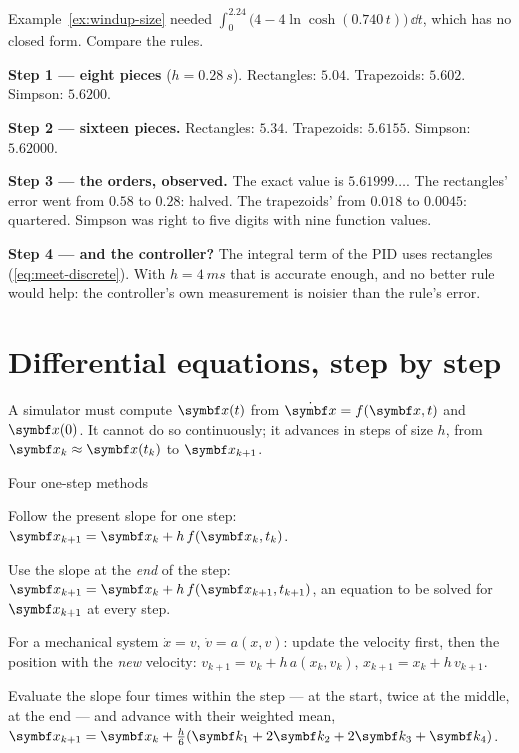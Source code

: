 \begin{example}
\label{ex:F-quad}
Example~\ref{ex:windup-size} needed $\int_0^{2.24}\big(4 - 4\ln\cosh(0.740\,t)\big)\,\dd t$, which has no closed form. Compare the rules.

\textbf{Step 1 — eight pieces} ($h = \SI{0.28}{s}$). Rectangles: $5.04$. Trapezoids: $5.602$. Simpson: $5.6200$.

\textbf{Step 2 — sixteen pieces.} Rectangles: $5.34$. Trapezoids: $5.6155$. Simpson: $5.62000$.

\textbf{Step 3 — the orders, observed.} The exact value is $5.61999\dots$. The rectangles' error went from $0.58$ to $0.28$: halved. The trapezoids' from $0.018$ to $0.0045$: quartered. Simpson was right to five digits with nine function values.

\textbf{Step 4 — and the controller?} The integral term of the PID uses rectangles (\cref{eq:meet-discrete}). With $h = \SI{4}{ms}$ that is accurate enough, and no better rule would help: the controller's own measurement is noisier than the rule's error.
\end{example}

\section{Differential equations, step by step}

A simulator must compute $\vx(t)$ from $\dot{\vx} = f(\vx, t)$ and $\vx(0)$. It cannot do so continuously; it advances in steps of size $h$, from $\vx_k \approx \vx(t_k)$ to $\vx_{k+1}$.

\begin{definition}{Four one-step methods}
\begin{description}[leftmargin=0pt, itemsep=3pt, font=\sffamily\small\bfseries]
  \item[Explicit Euler.] Follow the present slope for one step: $\vx_{k+1} = \vx_k + h\,f(\vx_k, t_k)$.
  \item[Implicit Euler.] Use the slope at the \emph{end} of the step: $\vx_{k+1} = \vx_k + h\,f(\vx_{k+1}, t_{k+1})$, an equation to be solved for $\vx_{k+1}$ at every step.
  \item[Semi-implicit (symplectic) Euler.] For a mechanical system $\dot x = v$, $\dot v = a(x, v)$: update the velocity first, then the position with the \emph{new} velocity: $v_{k+1} = v_k + h\,a(x_k, v_k)$, $x_{k+1} = x_k + h\,v_{k+1}$.
  \item[Runge–Kutta of order four (RK4).] Evaluate the slope four times within the step — at the start, twice at the middle, at the end — and advance with their weighted mean, $\vx_{k+1} = \vx_k + \tfrac{h}{6}(\symbf k_1 + 2\symbf k_2 + 2\symbf k_3 + \symbf k_4)$.
\end{description}
\end{definition}

